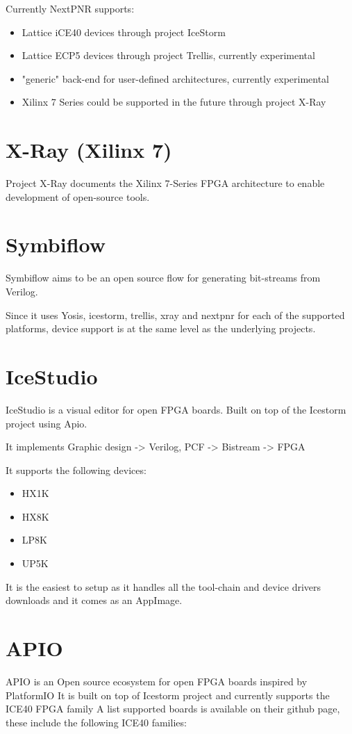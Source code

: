 Currently NextPNR supports:
\begin{itemize}
\item Lattice iCE40 devices through project IceStorm
\item Lattice ECP5 devices through project Trellis, currently experimental
\item "generic" back-end for user-defined architectures, currently experimental
\item Xilinx 7 Series could be supported in the future through project X-Ray 
\end{itemize}

\section{X-Ray (Xilinx 7)}
Project X-Ray documents the Xilinx 7-Series FPGA architecture to enable development of open-source tools.



\section{Symbiflow}
Symbiflow aims to be an open source flow for generating bit-streams from Verilog. 

Since it uses Yosis, icestorm, trellis, xray and nextpnr for each of the supported platforms, device support is at the same level as the underlying projects.


\section{IceStudio}
IceStudio is a visual editor for open FPGA boards. Built on top of the Icestorm project using Apio.

It implements Graphic design -> Verilog, PCF -> Bistream -> FPGA

It supports the following devices:

\begin{itemize}
\item HX1K
\item HX8K
\item LP8K
\item UP5K
\end{itemize}

It is the easiest to setup as it handles all the tool-chain and device drivers downloads and it comes as an AppImage.

\section{APIO}
APIO is an Open source ecosystem for open FPGA boards inspired by PlatformIO
It is built on top of Icestorm project and currently supports the ICE40 FPGA family
A list supported boards is available on their github page, these include the following ICE40 families:

